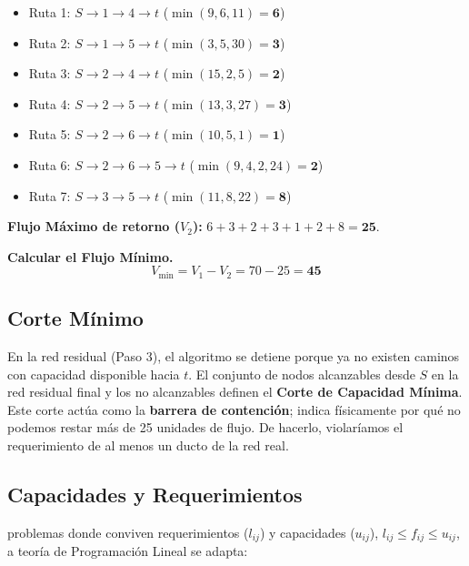 \documentclass[10pt,a4paper]{article}
\begin{document}
\begin{itemize}
    \item Ruta 1: $S \to 1 \to 4 \to t$ ($\min(9,6,11) = \mathbf{6}$)
    \item Ruta 2: $S \to 1 \to 5 \to t$ ($\min(3,5,30) = \mathbf{3}$)
    \item Ruta 3: $S \to 2 \to 4 \to t$ ($\min(15,2,5) = \mathbf{2}$)
    \item Ruta 4: $S \to 2 \to 5 \to t$ ($\min(13,3,27) = \mathbf{3}$)
    \item Ruta 5: $S \to 2 \to 6 \to t$ ($\min(10,5,1) = \mathbf{1}$)
    \item Ruta 6: $S \to 2 \to 6 \to 5 \to t$ ($\min(9,4,2,24) = \mathbf{2}$)
    \item Ruta 7: $S \to 3 \to 5 \to t$ ($\min(11,8,22) = \mathbf{8}$)
\end{itemize}
\textbf{Flujo Máximo de retorno ($V_2$):} $6 + 3 + 2 + 3 + 1 + 2 + 8 = \mathbf{25}$.

\textbf{Calcular el Flujo Mínimo.}
\begin{equation*}
    V_{\min} = V_1 - V_2 = 70 - 25 = \mathbf{45}
\end{equation*}

\subsection{Corte Mínimo}

En la red residual (Paso 3), el algoritmo se detiene 
porque ya no existen caminos con capacidad disponible 
hacia $t$. El conjunto de nodos alcanzables desde $S$ 
en la red residual final y los no alcanzables definen 
el \textbf{Corte de Capacidad Mínima}.
Este corte actúa como la \textbf{barrera de contención}; indica físicamente por qué no podemos restar más de 25 unidades de flujo. De hacerlo, violaríamos el requerimiento de al menos un ducto de la red real.

\subsection{ Capacidades y Requerimientos}

problemas donde conviven requerimientos ($l_{ij}$) y 
capacidades ($u_{ij}$),
 $l_{ij} \le f_{ij} \le u_{ij}$, 
 a teoría de Programación Lineal se adapta:
\end{document}
